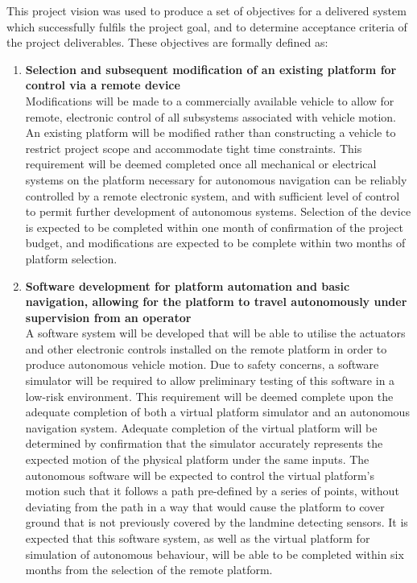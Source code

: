\documentclass[main.tex]{subfiles}
\begin{document}
This project vision was used to produce a set of objectives for a delivered system which successfully fulfils the project goal, and to determine acceptance criteria of the project deliverables. 
These objectives are formally defined as:

\begin{enumerate}
\item \textbf{Selection and subsequent modification of an existing platform for control via a remote device}\\ 
Modifications will be made to a commercially available vehicle to allow for remote, electronic control of all subsystems associated with vehicle motion.
An existing platform will be modified rather than constructing a vehicle to restrict project scope and accommodate tight time constraints. 
This requirement will be deemed completed once all mechanical or electrical systems on the platform necessary for autonomous navigation can be reliably controlled by a remote electronic system, and with sufficient level of control to permit further development of autonomous systems. 
Selection of the device is expected to be completed within one month of confirmation of the project budget, and modifications are expected to be complete within two months of platform selection.

\item \textbf{Software development for platform automation and basic navigation, allowing for the platform to travel autonomously under supervision from an operator}\\ 
A software system will be developed that will be able to utilise the actuators and other electronic controls installed on the remote platform in order to produce autonomous vehicle motion. 
Due to safety concerns, a software simulator will be required to allow preliminary testing of this software in a low-risk environment. 
This requirement will be deemed complete upon the adequate completion of both a virtual platform simulator and an autonomous navigation system. 
Adequate completion of the virtual platform will be determined by confirmation that the simulator accurately represents the expected motion of the physical platform under the same inputs.
The autonomous software will be expected to control the virtual platform’s motion such that it follows a path pre-defined by a series of points, without deviating from the path in a way that would cause the platform to cover ground that is not previously covered by the landmine detecting sensors. 
It is expected that this software system, as well as the virtual platform for simulation of autonomous behaviour, will be able to be completed within six months from the selection of the remote platform.


\end{enumerate}
\end{document}
